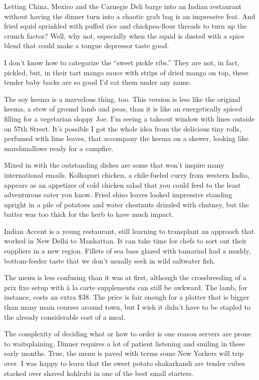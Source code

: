 Letting China, Mexico and the Carnegie Deli barge into an Indian
restaurant without having the dinner turn into a chaotic grab bag is an
impressive feat. And fried squid sprinkled with puffed rice and
chickpea-flour threads to turn up the crunch factor? Well, why not,
especially when the squid is dusted with a spice blend that could make a
tongue depressor taste good.

I don't know how to categorize the ``sweet pickle ribs.'' They are not,
in fact, pickled, but, in their tart mango sauce with strips of dried
mango on top, these tender baby backs are so good I'd eat them under any
name.

The soy keema is a marvelous thing, too. This version is less like the
original keema, a stew of ground lamb and peas, than it is like an
energetically spiced filling for a vegetarian sloppy Joe. I'm seeing a
takeout window with lines outside on 57th Street. It's possible I got
the whole idea from the delicious tiny rolls, perfumed with lime leaves,
that accompany the keema on a skewer, looking like marshmallows ready
for a campfire.

Mixed in with the outstanding dishes are some that won't inspire many
international emails. Kolhapuri chicken, a chile-fueled curry from
western India, appears as an appetizer of cold chicken salad that you
could feed to the least adventurous eater you know. Fried shiso leaves
looked impressive standing upright in a pile of potatoes and water
chestnuts drizzled with chutney, but the batter was too thick for the
herb to have much impact.

Indian Accent is a young restaurant, still learning to transplant an
approach that worked in New Delhi to Manhattan. It can take time for
chefs to sort out their suppliers in a new region. Fillets of sea bass
glazed with tamarind had a muddy, bottom-feeder taste that we don't
usually seek in wild saltwater fish.

The menu is less confusing than it was at first, although the
crossbreeding of a prix fixe setup with à la carte supplements can still
be awkward. The lamb, for instance, costs an extra \$38. The price is
fair enough for a platter that is bigger than many main courses around
town, but I wish it didn't have to be stapled to the already
considerable cost of a meal.

The complexity of deciding what or how to order is one reason servers
are prone to waitsplaining. Dinner requires a lot of patient listening
and smiling in these early months. True, the menu is paved with terms
some New Yorkers will trip over. I was happy to learn that the sweet
potato shakarkandi are tender cubes stacked over shaved kohlrabi in one
of the best small starters.

